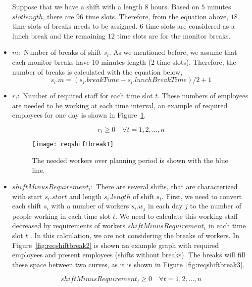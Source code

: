 \begin{itemize}
Suppose that we have a shift with a length 8 hours. Based on $5$ minutes $slotlength$, there are 96 time slots. Therefore, from the equation above, $18$ time slots of breaks needs to be assigned. $6$ time slots are considered as a lunch break and the remaining $12$ time slots are for the monitor breaks. 

\item $m : $ Number of breaks of shift $s_i$. As we mentioned before, we assume that each monitor breaks have 10 minutes length (2 time slots). Therefore, the number of breaks is calculated with the equation below,
\begin{equation}
s_i.m   = (s_i.breakTime - s_i.lunchBreakTime) / 2 + 1
\end{equation}




\item $r_t : $ Number of required staff for each time slot $t$. These numbers of employees are needed to be working at each time interval, an example of required employees for one day is shown in Figure~\ref{fig:reqshiftbreak1}. 

\begin{equation}
r_t \ge 0 \quad \forall t = 1, 2, ..., n
\end{equation}

\begin{figure}[h]
  \centering
  \texttt{[image: reqshiftbreak1]}
  \caption{The needed workers over planning period is shown with the blue line.}
  \label{fig:reqshiftbreak1} 
\end{figure}

\item  $shiftMinusRequirement_t : $ There are several shifts, that are characterized with start $s_i.start$ and length $s_i.length$ of shift $s_i$. First, we need to convert each shift $s_i$ with a number of workers $s_i.w_j$ in  each day $j$ to the number of people working in each time slot $t$. We need to calculate this working staff decreased by requirements of workers $shiftMinusRequirement_t$ in each time slot $t$ . In this calculation, we are not considering the breaks of workers. In Figure~\ref{fig:reqshiftbreak2} is shown an example graph with required employees and present employees (shifts without breaks). The breaks will fill these space between two curves, as it is shown in Figure~\ref{fig:reqshiftbreak3}.

\begin{equation}
shiftMinusRequirement_t \ge 0 \quad \forall t = 1, 2, ..., n
\end{equation}



\end{itemize}
